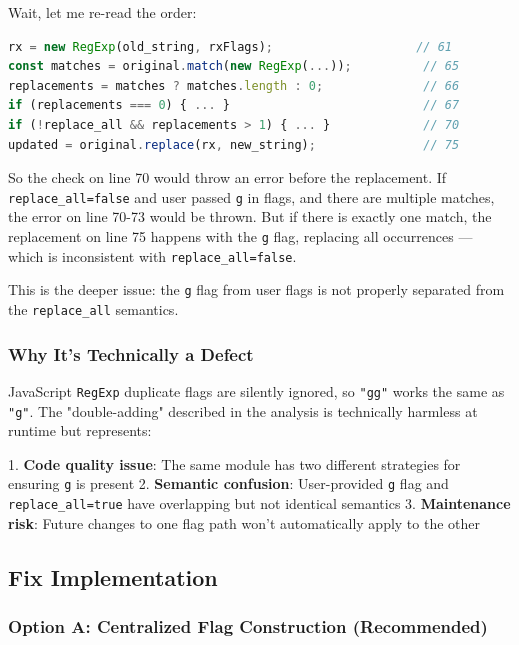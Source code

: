 Wait, let me re-read the order:



\begin{lstlisting}[language=TypeScript]
rx = new RegExp(old_string, rxFlags);                    // 61
const matches = original.match(new RegExp(...));          // 65
replacements = matches ? matches.length : 0;              // 66
if (replacements === 0) { ... }                           // 67
if (!replace_all && replacements > 1) { ... }             // 70
updated = original.replace(rx, new_string);               // 75

\end{lstlisting}



So the check on line 70 would throw an error before the replacement. If \texttt{replace\_all=false} and user passed \texttt{g} in flags, and there are multiple matches, the error on line 70-73 would be thrown. But if there is exactly one match, the replacement on line 75 happens with the \texttt{g} flag, replacing all occurrences — which is inconsistent with \texttt{replace\_all=false}.

This is the deeper issue: the \texttt{g} flag from user flags is not properly separated from the \texttt{replace\_all} semantics.

\subsubsection*{Why It's Technically a Defect}

JavaScript \texttt{RegExp} duplicate flags are silently ignored, so \texttt{"gg"} works the same as \texttt{"g"}. The "double-adding" described in the analysis is technically harmless at runtime but represents:

1. \textbf{Code quality issue}: The same module has two different strategies for ensuring \texttt{g} is present
2. \textbf{Semantic confusion}: User-provided \texttt{g} flag and \texttt{replace\_all=true} have overlapping but not identical semantics
3. \textbf{Maintenance risk}: Future changes to one flag path won't automatically apply to the other


\subsection*{Fix Implementation}
\subsubsection*{Option A: Centralized Flag Construction (Recommended)}



